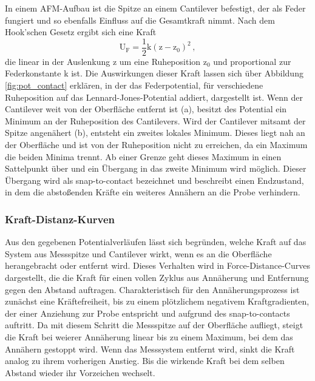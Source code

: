           \FloatBarrier      
          In einem AFM-Aufbau ist die Spitze an einem Cantilever befestigt, der als Feder fungiert und so ebenfalls Einfluss auf die Gesamtkraft nimmt. Nach dem Hook'schen Gesetz ergibt sich eine Kraft 
          \begin{equation*}
            \text{U}_{\text{F}} = \frac{1}{2} \text{k} \left(\text{z} - \text{z}_0\right)^2 \, ,
          \end{equation*}
          die linear in der Auslenkung z um eine Ruheposition z$_0$ und proportional zur Federkonstante k ist. 
          Die Auswirkungen dieser Kraft lassen sich über Abbildung \ref{fig:pot_contact} erklären, in der 
          das Federpotential, für verschiedene Ruheposition auf das Lennard-Jones-Potential addiert, dargestellt ist. Wenn der Cantilever weit von der Oberfläche entfernt ist (a), besitzt des Potential ein 
          Minimum an der Ruheposition des Cantilevers. Wird der Cantilever mitsamt der Spitze angenähert (b), entsteht ein zweites lokales Minimum. Dieses liegt nah an der Oberfläche und ist von der Ruheposition
          nicht zu erreichen, da ein Maximum die beiden Minima trennt. Ab einer Grenze geht dieses Maximum in einen Sattelpunkt über und ein Übergang in das zweite Minimum wird möglich. Dieser Übergang wird als
          snap-to-contact bezeichnet und beschreibt einen Endzustand, in dem die abstoßenden Kräfte ein weiteres Annähern an die Probe verhindern. 




        \newpage
        \subsubsection{Kraft-Distanz-Kurven}

          Aus den gegebenen Potentialverläufen lässt sich begründen, welche Kraft auf das System aus Messspitze und Cantilever wirkt, wenn es an die Oberfläche herangebracht oder entfernt wird. Dieses Verhalten
          wird in Force-Distance-Curves dargestellt, die die Kraft für einen vollen Zyklus aus Annäherung und Entfernung gegen den Abstand auftragen. Charakteristisch für den Annäherungsprozess ist zunächst
          eine Kräftefreiheit, bis zu einem plötzlichem negativem Kraftgradienten, der einer Anziehung zur Probe entspricht und aufgrund des snap-to-contacts auftritt. Da mit diesem Schritt die Messspitze auf 
          der Oberfläche aufliegt, steigt die Kraft bei weierer Annäherung linear bis zu einem Maximum, bei dem das Annähern gestoppt wird. Wenn das Messsystem entfernt wird, sinkt die Kraft analog zu ihrem 
          vorherigen Anstieg. Bis die wirkende Kraft bei dem selben Abstand wieder ihr Vorzeichen wechselt.


